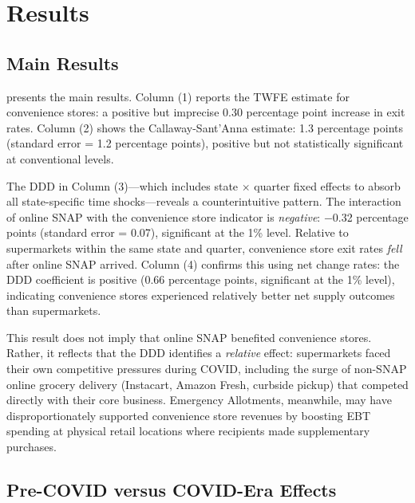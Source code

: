 \documentclass[12pt]{article}
\begin{document}
\section{Results}

\subsection{Main Results}

\begin{table}[H]
\centering
\begin{threeparttable}

\end{threeparttable}
\end{table}

 presents the main results. Column (1) reports the TWFE estimate for convenience stores: a positive but imprecise 0.30 percentage point increase in exit rates. Column (2) shows the Callaway-Sant'Anna estimate: 1.3 percentage points (standard error = 1.2 percentage points), positive but not statistically significant at conventional levels.

The DDD in Column (3)---which includes state $\times$ quarter fixed effects to absorb all state-specific time shocks---reveals a counterintuitive pattern. The interaction of online SNAP with the convenience store indicator is \emph{negative}: $-$0.32 percentage points (standard error = 0.07), significant at the 1\% level. Relative to supermarkets within the same state and quarter, convenience store exit rates \emph{fell} after online SNAP arrived. Column (4) confirms this using net change rates: the DDD coefficient is positive (0.66 percentage points, significant at the 1\% level), indicating convenience stores experienced relatively better net supply outcomes than supermarkets.

This result does not imply that online SNAP benefited convenience stores. Rather, it reflects that the DDD identifies a \emph{relative} effect: supermarkets faced their own competitive pressures during COVID, including the surge of non-SNAP online grocery delivery (Instacart, Amazon Fresh, curbside pickup) that competed directly with their core business. Emergency Allotments, meanwhile, may have disproportionately supported convenience store revenues by boosting EBT spending at physical retail locations where recipients made supplementary purchases.

\subsection{Pre-COVID versus COVID-Era Effects}
\end{document}

